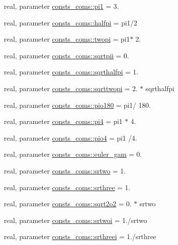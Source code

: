 \begin{DoxyCompactItemize}
\item 
real, parameter \hyperlink{namespaceconsts__coms_ae7b07ddab326c63b9c81a9c607cb79f8}{consts\+\_\+coms\+::pi1} = 3.
\item 
real, parameter \hyperlink{namespaceconsts__coms_abbda065eaf0f93e7f1f973705faf75ea}{consts\+\_\+coms\+::halfpi} = pi1/2
\item 
real, parameter \hyperlink{namespaceconsts__coms_a1e788efd80b24feef7cf49effb1c3106}{consts\+\_\+coms\+::twopi} = pi1$\ast$ 2.
\item 
real, parameter \hyperlink{namespaceconsts__coms_a7ccaba833293a307822d6d2e4e58b992}{consts\+\_\+coms\+::sqrtpii} = 0.
\item 
real, parameter \hyperlink{namespaceconsts__coms_a8b1886af4e49f971a141bf7eeb315fa6}{consts\+\_\+coms\+::sqrthalfpi} = 1.
\item 
real, parameter \hyperlink{namespaceconsts__coms_a7a26b6224c394bb825fefb5da925c95b}{consts\+\_\+coms\+::sqrttwopi} = 2. $\ast$ sqrthalfpi
\item 
real, parameter \hyperlink{namespaceconsts__coms_a42c7511eb2987c443fbfb41d92142b8f}{consts\+\_\+coms\+::pio180} = pi1/ 180.
\item 
real, parameter \hyperlink{namespaceconsts__coms_a9ab90617058485a809d50b5bf043eda4}{consts\+\_\+coms\+::pi4} = pi1 $\ast$ 4.
\item 
real, parameter \hyperlink{namespaceconsts__coms_a54e6b465d8b81b90409f351986d2a4de}{consts\+\_\+coms\+::pio4} = pi1 /4.
\item 
real, parameter \hyperlink{namespaceconsts__coms_aba6e0fb8ee2b35386bc108bca41f91d4}{consts\+\_\+coms\+::euler\+\_\+gam} = 0.
\item 
real, parameter \hyperlink{namespaceconsts__coms_ad2093037aef885081f727f22fe6b2554}{consts\+\_\+coms\+::srtwo} = 1.
\item 
real, parameter \hyperlink{namespaceconsts__coms_a17913c8f0ccea4623bad63371995c51f}{consts\+\_\+coms\+::srthree} = 1.
\item 
real, parameter \hyperlink{namespaceconsts__coms_a21cd110a4618508e5aabb43b56aa56d6}{consts\+\_\+coms\+::sqrt2o2} = 0. $\ast$ srtwo
\item 
real, parameter \hyperlink{namespaceconsts__coms_a1dbb872d0aae3243d72b9c43864ec88f}{consts\+\_\+coms\+::srtwoi} = 1./srtwo
\item 
real, parameter \hyperlink{namespaceconsts__coms_a448722d61ca70f7d3d572048be47c1e5}{consts\+\_\+coms\+::srthreei} = 1./srthree

\end{DoxyCompactItemize}
